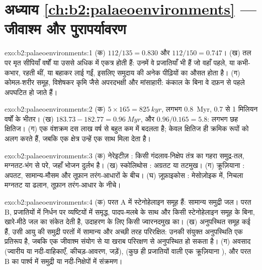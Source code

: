 \section*{अध्याय \ref{ch:b2:palaeoenvironments} --- जीवाश्म और पुरापर्यावरण}

\begin{solution}{exo:b2:palaeoenvironments:1}
(क) $112/135 = 0.830$ और $112/150 = 0.747$। (ख) तल पर मृत सीपियाँ वर्षों या उससे अधिक में एकत्र
होती हैं: उनमें वे प्रजातियाँ भी हैं जो वहाँ पहले, या कभी-कभार, रहती थीं, या बहाकर लाई गईं, इसलिए
 समुदाय की अनेक पीढ़ियों का औसत होता है। (ग) कोमल-शरीर समूह,
विशेषकर कृमि जैसे अपरदभक्षी और मांसाहारी: कंकाल के बिना वे दफ़न से पहले अपघटित हो जाते हैं।
\end{solution}

\begin{solution}{exo:b2:palaeoenvironments:2}
(क) $5 \times 165 = \qty{825}{kyr}$, लगभग \qty{0.8}{Myr}, 0.7 से 1 मिलियन वर्षों के भीतर।
(ख) $183.73 - 182.77 = \qty{0.96}{Myr}$, और $0.96/0.165 = 5.8$: लगभग छह क्षितिज। (ग) एक
वंशक्रम दस लाख वर्ष से बहुत कम में बदलता है; केवल क्षितिज ही क्रमिक रूपों को अलग करते हैं,
जबकि एक क्षेत्र उन्हें एक साथ मिला देता है।
\end{solution}

\begin{solution}{exo:b2:palaeoenvironments:3}
(क) नेरेइटीज़ : किसी गंदलाव-निक्षेप तंत्र का गहरा समुद्र-तल, मग्नतट-भंग से परे, जहाँ
भोजन दुर्लभ है। (ख) स्कोलिथोस : अग्रतट या तटमुख। (ग) क्रूज़ियाना :
अपतट, सामान्य-मौसम और तूफ़ान तरंग-आधारों के बीच। (घ) ज़ूफ़ाइकोस :
मेसोज़ोइक में, निचला मग्नतट या ढलान, तूफ़ान तरंग-आधार के नीचे।
\end{solution}

\begin{solution}{exo:b2:palaeoenvironments:4}
(क) परत A में स्टेनोहेलाइन समूह हैं: सामान्य समुद्री जल। परत B, प्रजातियों में निर्धन पर
व्यष्टियों में समृद्ध, पादप-मलबे के साथ और किसी स्टेनोहेलाइन समूह के बिना, खारे-मीठे जल का संकेत देती है,
उदाहरण के लिए किसी ज्वारनदमुख का। (ख) अनुपस्थित समूह कई हैं, उसी आयु की समुद्री परतों में सामान्य और
अच्छी तरह परिरक्षित: उनकी संयुक्त अनुपस्थिति एक प्रतिरूप है, जबकि एक जीवाश्म संयोग से या
खराब परिरक्षण से अनुपस्थित हो सकता है। (ग) अवसाद (ज्वारीय या नदी-वाहिकाएँ, कीचड़-आवरण, जड़ें),  (कुछ ही प्रजातियों वाली एक क्रूज़ियाना ), और परत B का पार्श्व में
समुद्री या नदी-निक्षेपों में संक्रमण।
\end{solution}

